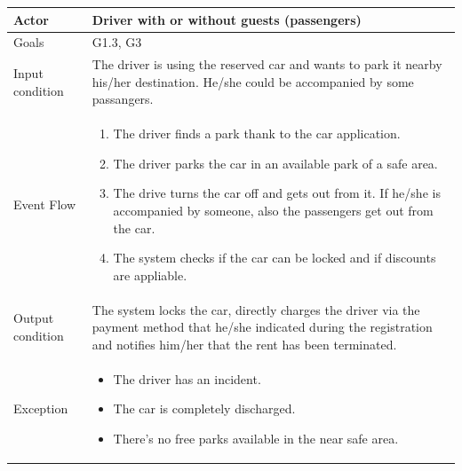 \begin{table}[H]
	\begin{center}
		\begin{tabular}{| l | p{} |}
			\hline
			Actor & Driver with or without guests (passengers) \\
			\hline
			Goals & G1.3, G3
			\\
			\hline
			Input condition & The driver is using the reserved car and wants to park it nearby his/her destination. He/she could be accompanied by some passangers. \\
			\hline
			Event Flow & \begin{enumerate}
				\item The driver finds a park thank to the car application.
				\item The driver parks the car in an available park of a safe area.
				\item The drive turns the car off and gets out from it. If he/she is accompanied by someone, also the passengers get out from the car.
				\item The system checks if the car can be locked and if discounts are appliable. 
			\end{enumerate}
			\\
			\hline
			Output condition & The system locks the car, directly charges the driver via the payment method that he/she indicated during the registration and notifies him/her that the rent has been terminated.\\
			\hline
			
			Exception &  \begin{itemize}
				\item The driver has an incident.
				\item The car is completely discharged.	
				\item There's no free parks available in the near safe area.	
			\end{itemize}
			\\
			\hline
		\end{tabular}
	\end{center}
\end{table}

